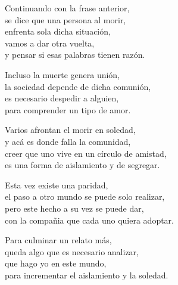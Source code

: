 \begin{center}
\vspace{1em} 
Continuando con la frase anterior,\\ 
se dice que una persona al morir,\\ 
enfrenta sola dicha situación,\\ 
vamos a dar otra vuelta,\\ 
y pensar si esas palabras tienen razón.

\vspace{1em} 
Incluso la muerte genera unión,\\ 
la sociedad depende de dicha comunión,\\ 
es necesario despedir a alguien,\\ 
para comprender un tipo de amor.

\vspace{1em} 
Varios afrontan el morir en soledad,\\ 
y acá es donde falla la comunidad,\\ 
creer que uno vive en un círculo de amistad,\\ 
es una forma de aislamiento y de segregar.

\vspace{1em} 
Esta vez existe una paridad,\\ 
el paso a otro mundo se puede solo realizar,\\ 
pero este hecho a su vez se puede dar,\\ 
con la compañia que cada uno quiera adoptar.

\vspace{1em} 
Para culminar un relato más,\\ 
queda algo que es necesario analizar,\\ 
que hago yo en este mundo,\\ 
para incrementar el aislamiento y la soledad.

\end{center}




